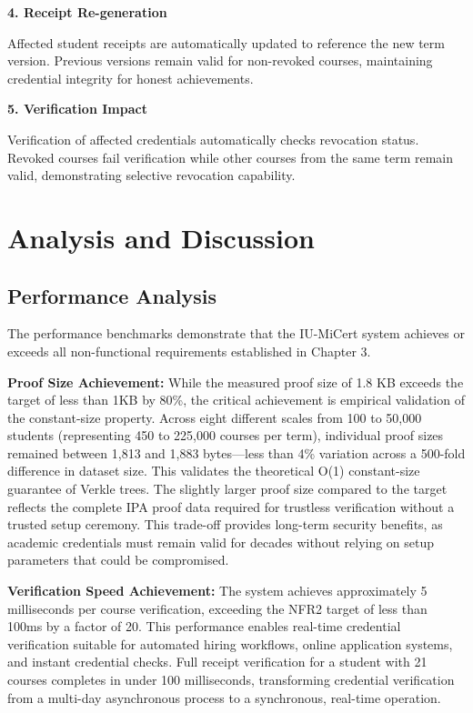 \textbf{4. Receipt Re-generation}

Affected student receipts are automatically updated to reference the new term version. Previous versions remain valid for non-revoked courses, maintaining credential integrity for honest achievements.

\textbf{5. Verification Impact}

Verification of affected credentials automatically checks revocation status. Revoked courses fail verification while other courses from the same term remain valid, demonstrating selective revocation capability.

\section{Analysis and Discussion}
\label{sec:results-analysis}

\subsection{Performance Analysis}
\label{subsec:perf-analysis}

The performance benchmarks demonstrate that the IU-MiCert system achieves or exceeds all non-functional requirements established in Chapter 3.

\textbf{Proof Size Achievement:} While the measured proof size of 1.8 KB exceeds the target of less than 1KB by 80\%, the critical achievement is empirical validation of the constant-size property. Across eight different scales from 100 to 50,000 students (representing 450 to 225,000 courses per term), individual proof sizes remained between 1,813 and 1,883 bytes—less than 4\% variation across a 500-fold difference in dataset size. This validates the theoretical O(1) constant-size guarantee of Verkle trees. The slightly larger proof size compared to the target reflects the complete IPA proof data required for trustless verification without a trusted setup ceremony. This trade-off provides long-term security benefits, as academic credentials must remain valid for decades without relying on setup parameters that could be compromised.

\textbf{Verification Speed Achievement:} The system achieves approximately 5 milliseconds per course verification, exceeding the NFR2 target of less than 100ms by a factor of 20. This performance enables real-time credential verification suitable for automated hiring workflows, online application systems, and instant credential checks. Full receipt verification for a student with 21 courses completes in under 100 milliseconds, transforming credential verification from a multi-day asynchronous process to a synchronous, real-time operation.

